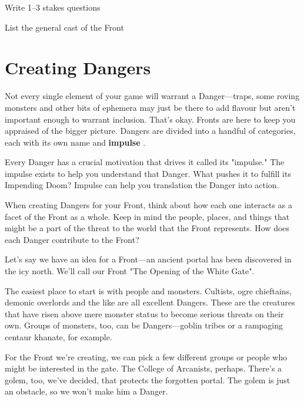  
\item Write 1–3 stakes questions

 
\item List the general cast of the Front


\stopitemize
 
\section{Creating Dangers}   
 

Not every single element of your game will warrant a Danger—traps, some roving monsters and other bits of ephemera may just be there to add flavour but aren't important enough to warrant inclusion. That’s okay. Fronts are here to keep you appraised of the bigger picture. Dangers are divided into a handful of categories, each with its own name and {\bf impulse} .

 

Every Danger has a crucial motivation that drives it called its "impulse." The impulse exists to help you understand that Danger. What pushes it to fulfill its Impending Doom? Impulse can help you translation the Danger into action.

 

When creating Dangers for your Front, think about how each one interacts as a facet of the Front as a whole. Keep in mind the people, places, and things that might be a part of the threat to the world that the Front represents. How does each Danger contribute to the Front?

 
\startExample
Let's say we have an idea for a Front—an ancient portal has been discovered in the icy north. We'll call our Front "The Opening of the White Gate".
\stopExample
 

The easiest place to start is with people and monsters. Cultists, ogre chieftains, demonic overlords and the like are all excellent Dangers. These are the creatures that have risen above mere monster status to become serious threats on their own. Groups of monsters, too, can be Dangers—goblin tribes or a rampaging centaur khanate, for example.

 
\startExample
For the Front we're creating, we can pick a few different groups or people who might be interested in the gate. The College of Arcanists, perhaps. There's a golem, too, we've decided, that protects the forgotten portal. The golem is just an obstacle, so we won't make him a Danger.
\stopExample
 


